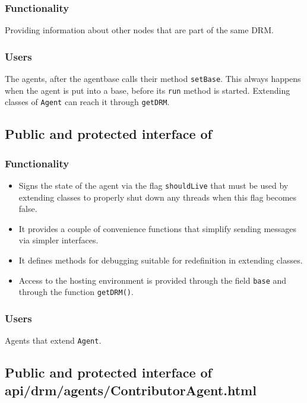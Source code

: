 \documentclass{article}
\begin{document}
\subsubsection{Functionality}

Providing information about other nodes that are part of the same DRM.

\subsubsection{Users}

The agents, after the agentbase calls their method {\tt setBase}.
This always happens when the agent is put into a base, before its
{\tt run} method is started.
Extending classes of {\tt Agent} can reach it through {\tt getDRM}.

\subsection{Public and protected interface of 
}

\subsubsection{Functionality}

\begin{itemize}
\item Signs the state of the agent via the flag {\tt shouldLive}
 that must be used by extending classes
 to properly shut down any threads when this flag becomes false.
\item It provides a couple of convenience functions that simplify sending
 messages via simpler interfaces.
\item It defines methods for debugging suitable for redefinition in extending
 classes.
\item Access to the hosting environment is provided through the field
 {\tt base} and through the function {\tt getDRM()}.
\end{itemize}

\subsubsection{Users}

Agents that extend {\tt Agent}. 

\subsection{Public and protected interface of
{api/drm/agents/ContributorAgent.html}}
\end{document}

